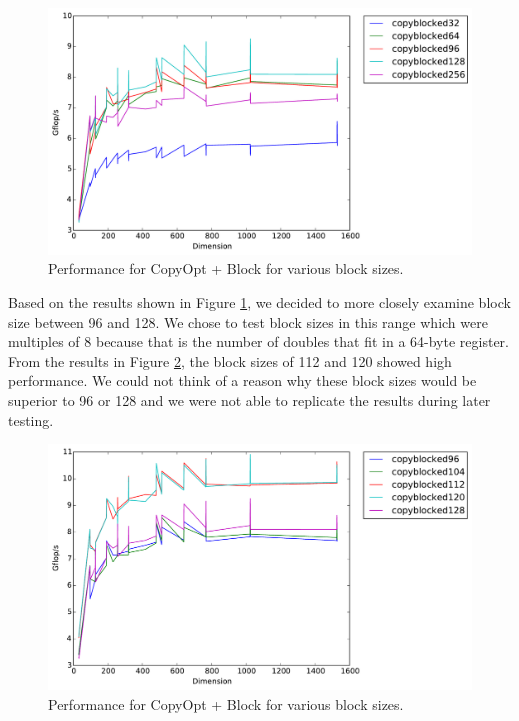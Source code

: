 \documentclass[12pt]{article}
\begin{document}
\begin{center}
\begin{figure}[h]
\includegraphics[width=16cm]{timing_copyblocked_comparison.pdf}
	\caption{Performance for CopyOpt + Block for various block sizes.}
	\label{fig:CopyBlockSizes}
\end{figure}
\end{center}



Based on the results shown in Figure \ref{fig:CopyBlockSizes}, we decided to more closely examine block size between 96 and 128.
We chose to test block sizes in this range which were multiples of 8 because that is the number of doubles that fit in a 64-byte register.
From the results in Figure \ref{fig:CopyBlockSizesZoom}, the block sizes of 112 and 120 showed high performance.
We could not think of a reason why these block sizes would be superior to 96 or 128 and we were not able to replicate the results during later testing.

\begin{center}
\begin{figure}[h]
\includegraphics[width=16cm]{timing_copyblocked_comparison_zoom.pdf}
	\caption{Performance for CopyOpt + Block for various block sizes.}
	\label{fig:CopyBlockSizesZoom}
\end{figure}
\end{center}
\end{document}
